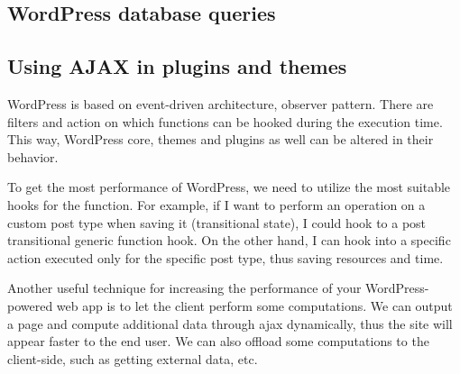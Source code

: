 \subsection{WordPress database queries}

\subsection{Using AJAX in plugins and themes}

WordPress is based on event-driven architecture, observer pattern. There are filters and action on which functions can be hooked during the execution time. This way, WordPress core, themes and plugins as well can be altered in their behavior.

To get the most performance of WordPress, we need to utilize the most suitable hooks for the function. For example, if I want to perform an operation on a custom post type when saving it (transitional state), I could hook to a post transitional generic function hook. On the other hand, I can hook into a specific action executed only for the specific post type, thus saving resources and time.


Another useful technique for increasing the performance of your WordPress-powered web app is to let the client perform some computations. We can output a page and compute additional data through ajax dynamically, thus the site will appear faster to the end user. We can also offload some computations to the client-side, such as getting external data, etc.


